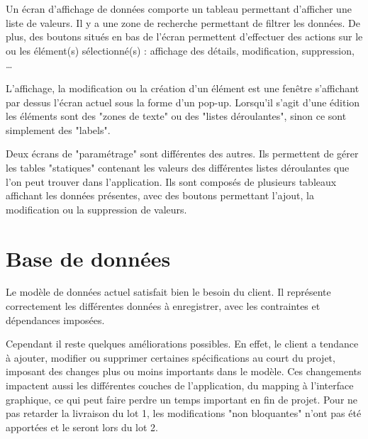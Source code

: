 Un écran d'affichage de données comporte un tableau permettant d'afficher une liste de valeurs.
Il y a une zone de recherche permettant de filtrer les données.
De plus, des boutons situés en bas de l'écran permettent d'effectuer des actions sur le ou les élément(s) sélectionné(s) : affichage des détails, modification, suppression, \ldots

L'affichage, la modification ou la création d'un élément est une fenêtre s'affichant par dessus l'écran actuel sous la forme d'un pop-up.
Lorsqu'il s'agit d'une édition les éléments sont des "zones de texte" ou des "listes déroulantes", sinon ce sont simplement des "labels".

Deux écrans de "paramétrage" sont différentes des autres.
Ils permettent de gérer les tables "statiques" contenant les valeurs des différentes listes déroulantes que l'on peut trouver dans l'application.
Ils sont composés de plusieurs tableaux affichant les données présentes, avec des boutons permettant l'ajout, la modification ou la suppression de valeurs.


\section{Base de données}

Le modèle de données actuel satisfait bien le besoin du client.
Il représente correctement les différentes données à enregistrer, avec les contraintes et dépendances imposées.

Cependant il reste quelques améliorations possibles.
En effet, le client a tendance à ajouter, modifier ou supprimer certaines spécifications au court du projet, imposant des changes plus ou moins importants dans le modèle.
Ces changements impactent aussi les différentes couches de l'application, du mapping à l'interface graphique, ce qui peut faire perdre un temps important en fin de projet.
Pour ne pas retarder la livraison du lot 1, les modifications "non bloquantes" n'ont pas été apportées et le seront lors du lot 2.


